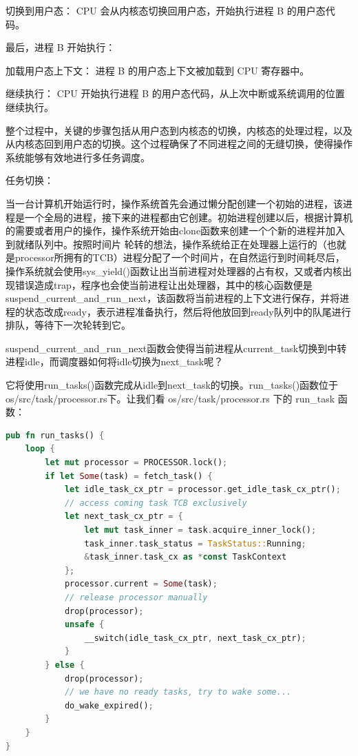 \quad \textbullet 切换到用户态： CPU 会从内核态切换回用户态，开始执行进程 B 的用户态代码。

最后，进程 B 开始执行：

\quad \textbullet 加载用户态上下文： 进程 B 的用户态上下文被加载到 CPU 寄存器中。
	
\quad \textbullet 继续执行： CPU 开始执行进程 B 的用户态代码，从上次中断或系统调用的位置继续执行。

整个过程中，关键的步骤包括从用户态到内核态的切换，内核态的处理过程，以及从内核态回到用户态的切换。这个过程确保了不同进程之间的无缝切换，使得操作系统能够有效地进行多任务调度。

任务切换：

当一台计算机开始运行时，操作系统首先会通过懒分配创建一个初始的进程，该进程是一个全局的进程，接下来的进程都由它创建。初始进程创建以后，根据计算机的需要或者用户的操作，操作系统开始由clone函数来创建一个个新的进程并加入到就绪队列中。按照时间片
轮转的想法，操作系统给正在处理器上运行的（也就是processor所拥有的TCB）进程分配了一个时间片，在自然运行到时间耗尽后，操作系统就会使用sys_yield()函数让出当前进程对处理器的占有权，又或者内核出现错误造成trap，程序也会使当前进程让出处理器，其中的核心函数便是suspend_current_and_run_next，该函数将当前进程的上下文进行保存，并将进程的状态改成ready，表示进程准备执行，然后将他放回到ready队列中的队尾进行排队，等待下一次轮转到它。

suspend_current_and_run_next函数会使得当前进程从current_task切换到中转进程idle，而调度器如何将idle切换为next_task呢？

它将使用run_tasks()函数完成从idle到next_task的切换。run_tasks()函数位于os/src/task/processor.rs下。让我们看 os/src/task/processor.rs 下的 run_task 函数：
\begin{lstlisting}[language=rust]
    pub fn run_tasks() {
    loop {
        let mut processor = PROCESSOR.lock();
        if let Some(task) = fetch_task() {
            let idle_task_cx_ptr = processor.get_idle_task_cx_ptr();
            // access coming task TCB exclusively
            let next_task_cx_ptr = {
                let mut task_inner = task.acquire_inner_lock();
                task_inner.task_status = TaskStatus::Running;
                &task_inner.task_cx as *const TaskContext
            };
            processor.current = Some(task);
            // release processor manually
            drop(processor);
            unsafe {
                __switch(idle_task_cx_ptr, next_task_cx_ptr);
            }
        } else {
            drop(processor);
            // we have no ready tasks, try to wake some...
            do_wake_expired();
        }
    }
}
\end{lstlisting}

